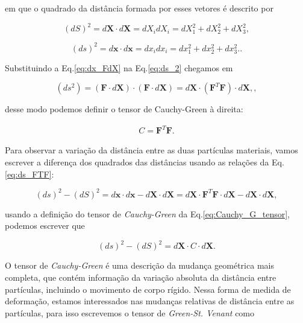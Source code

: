 em que o quadrado da distância formada por esses vetores é descrito por

\begin{equation}
	(dS)^2 = d\mathbf{X} \cdot d\mathbf{X}
	= dX_idX_i
	= dX_1^2 + dX_2^2 + dX_3^2,
\end{equation}

\begin{equation}
	(ds)^2 = d\mathbf{x} \cdot d\mathbf{x}
	= dx_idx_i
	= dx_1^2 + dx_2^2 + dx_3^2.
	\label{eq:ds_2}.
\end{equation}

Substituindo a Eq.\eqref{eq:dx_FdX} na Eq.\eqref{eq:ds_2} chegamos em 

\begin{equation}
	(ds^2) = (\mathbf{F} \cdot d\mathbf{X}) \cdot (\mathbf{F} \cdot d\mathbf{X})
	= d\mathbf{X} \cdot (\mathbf{F}^T \mathbf{F}) \cdot d\mathbf{X},
	\label{eq:ds_FTF},
\end{equation}

desse modo podemos definir o tensor de Cauchy-Green à direita:

\begin{eqnarray}
	C = \mathbf{F}^T \mathbf{F}.
	\label{eq:Cauchy_G_tensor}
\end{eqnarray}

Para observar a variação da distância entre as duas partículas materiais, vamos escrever a diferença dos quadrados das distâncias usando as relações da Eq.\eqref{eq:ds_FTF}:

\begin{equation}
	(ds)^2 - (dS)^2 = 
	d\mathbf{x} \cdot d\mathbf{x} -
	d\mathbf{X} \cdot d\mathbf{X}
	= d\mathbf{X} \cdot \mathbf{F}^T \mathbf{F} \cdot d\mathbf{X} -
	d\mathbf{X} \cdot d\mathbf{X},
\end{equation}

usando a definição do tensor de \textit{Cauchy-Green} da Eq.\eqref{eq:Cauchy_G_tensor}, podemos escrever que

\begin{equation}
	(ds)^2 - (dS)^2 = d\mathbf{X} \cdot C \cdot d\mathbf{X}.
	\label{eq:ds_C}
\end{equation}

O tensor de \textit{Cauchy-Green} é uma descrição da mudança geométrica mais completa, que contém informação da variação absoluta da distância entre partículas, incluindo o movimento de corpo rígido. Nessa forma de medida de deformação, estamos interessados nas mudanças relativas de distância entre as partículas, para isso escrevemos o tensor de \textit{Green-St. Venant} como 

